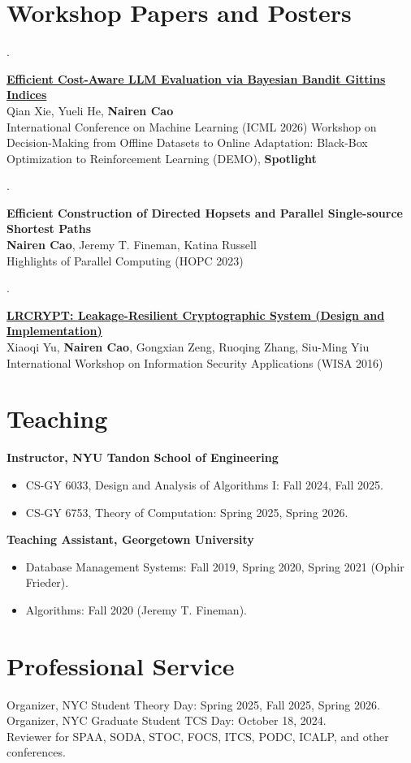 \documentclass[10pt,a4paper]{article}
\newcounter{pub}
\newcommand{\publication}[3]{\stepcounter{pub}\begin{samepage}\noindent\begin{minipage}[t]{0.045\linewidth}\sffamily\small\color{muted}\thepub.\end{minipage}\begin{minipage}[t]{0.95\linewidth}\textbf{#1}\\#2\\{\small\sffamily\color{ink}#3}\end{minipage}\par\vspace{7pt}\end{samepage}}
\begin{document}
\section{Workshop Papers and Posters}
\publication{\href{https://openreview.net/forum?id=GlVWFamE4j\&noteId=EPUyGqC3I7}{Efficient Cost-Aware LLM Evaluation via Bayesian Bandit Gittins Indices}}{Qian Xie, Yueli He, \textbf{Nairen Cao}}{International Conference on Machine Learning (ICML 2026) Workshop on Decision-Making from Offline Datasets to Online Adaptation: Black-Box Optimization to Reinforcement Learning (DEMO), \textbf{Spotlight}}
\publication{Efficient Construction of Directed Hopsets and Parallel Single-source Shortest Paths}{\textbf{Nairen Cao}, Jeremy T. Fineman, Katina Russell}{Highlights of Parallel Computing (HOPC 2023)}
\publication{\href{https://link.springer.com/chapter/10.1007/978-3-319-56549-1_20}{LRCRYPT: Leakage-Resilient Cryptographic System (Design and Implementation)}}{Xiaoqi Yu, \textbf{Nairen Cao}, Gongxian Zeng, Ruoqing Zhang, Siu-Ming Yiu}{International Workshop on Information Security Applications (WISA 2016)}
\section{Teaching}
\textbf{Instructor, NYU Tandon School of Engineering}
\begin{itemize}
\item CS-GY 6033, Design and Analysis of Algorithms I: Fall 2024, Fall 2025.
\item CS-GY 6753, Theory of Computation: Spring 2025, Spring 2026.
\end{itemize}
\textbf{Teaching Assistant, Georgetown University}
\begin{itemize}
\item Database Management Systems: Fall 2019, Spring 2020, Spring 2021 (Ophir Frieder).
\item Algorithms: Fall 2020 (Jeremy T. Fineman).
\end{itemize}

\section{Professional Service}
Organizer, NYC Student Theory Day: Spring 2025, Fall 2025, Spring 2026.\\
Organizer, NYC Graduate Student TCS Day: October 18, 2024.\\
Reviewer for SPAA, SODA, STOC, FOCS, ITCS, PODC, ICALP, and other conferences.
\end{document}

